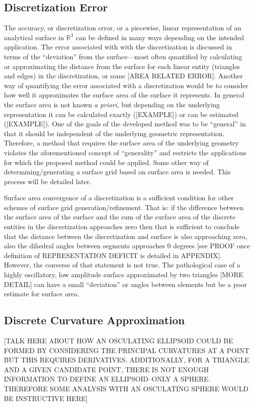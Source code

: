 \subsection{Discretization Error}
The accuracy, or discretization error, or a piecewise, linear representation of an analytical surface in ${\mathbb R}^3$ can be defined in many ways depending on the intended application. The error associated with with the discretization is discussed in terms of the ``deviation'' from the surface---most often quantified by calculating or approximating the distance from the surface for each linear entity (triangles and edges) in the discretization, or some [AREA RELATED ERROR]. Another way of quantifying the error associated with a discretization would be to consider how well it approximates the surface area of the surface it represents. In general the surface area is not known {\it a priori}, but depending on the underlying representation it can be calculated exactly ([EXAMPLE]) or can be estimated ([EXAMPLE]). One of the goals of the developed method was to be ``general'' in that it should be independent of the underlying geometric representation. Therefore, a method that requires the surface area of the underlying geometry violates the aforementioned concept of ``generality'' and restricts the applications for which the proposed method could be applied. Some other way of determining/generating a surface grid based on surface area is needed. This process will be detailed later.

Surface area convergence of a discretization is a sufficient condition for other schemes of surface grid generation/refinement. That is: if the difference between the surface area of the surface and the sum of the surface area of the discrete entities in the discretization approaches zero then that is sufficient to conclude that the distance between the discretization and surface is also approaching zero, also the dihedral angles between segments approaches $0$ degrees [see PROOF once definition of REPRESENTATION DEFICIT is detailed in APPENDIX]. However, the converse of that statement is not true. The pathological case of a highly oscillatory, low amplitude surface approximated by two triangles [MORE DETAIL] can have a small ``deviation'' or angles between elements but be a poor estimate for surface area.

\subsection{Discrete Curvature Approximation}
[TALK HERE ABOUT HOW AN OSCULATING ELLIPSOID COULD BE FORMED BY CONSIDERING THE PRINCIPAL CURVATURES AT A POINT BUT THIS REQUIRES DERIVATIVES. ADDITIONALLY, FOR A TRIANGLE AND A GIVEN CANDIDATE POINT, THERE IS NOT ENOUGH INFORMATION TO DEFINE AN ELLIPSOID--ONLY A SPHERE. THEREFORE SOME ANALYSIS WITH AN OSCULATING SPHERE WOULD BE INSTRUCTIVE HERE]

